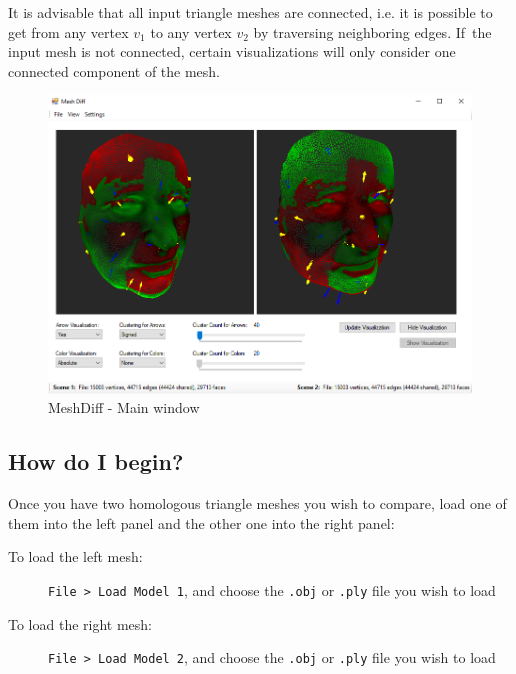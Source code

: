 It is advisable that all input triangle meshes are connected, i.e. it is possible to get from any vertex \(v_1\) to any vertex \(v_2\) by traversing neighboring edges. If~the input mesh is not connected, certain visualizations will only consider one connected component of the mesh.\footnotemark


\begin{figure}[h]
	\centering
	\includegraphics[width=\textwidth]{./img/meshdiff-new_ui.PNG}
	\caption[MeshDiff - Main window]{MeshDiff - Main window}
	\label{fig:meshdiff-new_ui}
\end{figure}

\subsection{How do I begin?}
\label{attch:user_doc-begin}

Once you have two homologous triangle meshes you wish to compare, load one of them into the left panel and the other one into the right panel:

\begin{description}
\item [To load the left mesh:] \verb+File > Load Model 1+, and choose the \verb+.obj+ or \verb+.ply+ file you wish to load
\item [To load the right mesh:] \verb+File > Load Model 2+, and choose the \verb+.obj+ or \verb+.ply+ file you wish to load
\end{description}

